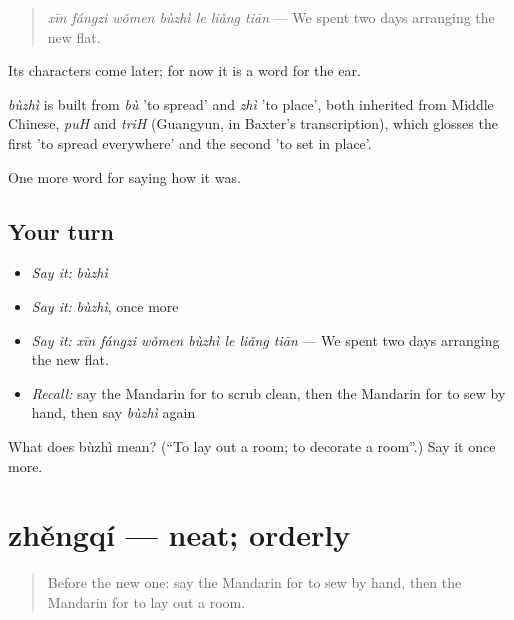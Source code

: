 \begin{quote}
\emph{xīn fángzi wǒmen bùzhì le liǎng tiān} — We spent two days arranging the new flat.
\end{quote}

Its characters come later; for now it is a word for the ear.

\begin{cousinweb}
\emph{bùzhì} is built from \emph{bù} 'to spread' and \emph{zhì} 'to place', both inherited from Middle Chinese, \emph{puH} and \emph{triH} (Guangyun, in Baxter's transcription), which glosses the first 'to spread everywhere' and the second 'to set in place'.
\end{cousinweb}

\begin{grammarlens}[title={What you've built}]
One more word for saying how it was.
\end{grammarlens}

\subsection*{Your turn}
\begin{itemize}
\raggedright
  \item \emph{Say it:} \emph{bùzhì}
  \item \emph{Say it:} \emph{bùzhì}, once more
  \item \emph{Say it:} \emph{xīn fángzi wǒmen bùzhì le liǎng tiān} — We spent two days arranging the new flat.
  \item \emph{Recall:} say the Mandarin for to scrub clean, then the Mandarin for to sew by hand, then say \emph{bùzhì} again
\end{itemize}

\begin{tcolorbox}[breakable,colback=teal!4,colframe=teal!35!black,title={Before you move on}]
What does bùzhì mean? (\textquotedblleft{}To lay out a room; to decorate a room\textquotedblright{}.) Say it once more.
\end{tcolorbox}
\section[zhěngqí]{zhěngqí — neat; orderly}

\label{lesson:ZH-C521-zhengqi}



\begin{quote}
Before the new one: say the Mandarin for to sew by hand, then the Mandarin for to lay out a room.
\end{quote}

